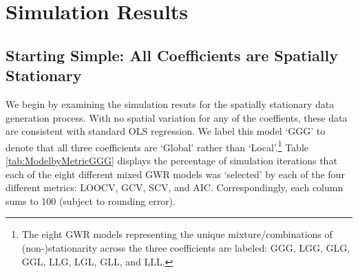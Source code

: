 \documentclass{article}\usepackage[]{graphicx}\usepackage[]{color}
\begin{document}
\section{Simulation Results}

\subsection{Starting Simple: All Coefficients are Spatially Stationary}

We begin by examining the simulation resuts for the spatially stationary data generation process. With no spatial variation for any of the coeffients, these data are consistent with standard OLS regression. We label this model `GGG' to denote that all three coefficients are `Global' rather than `Local'.\footnote{The eight GWR models representing the unique mixture/combinations of (non-)stationarity across the three coefficients are labeled: GGG, LGG, GLG, GGL, LLG, LGL, GLL, and LLL.} Table \ref{tab:ModelbyMetricGGG} displays the percentage of simulation iterations that each of the eight different mixed GWR models was `selected' by each of the four different metrics: LOOCV, GCV, SCV, and AIC. Correspondingly, each column sums to 100 (subject to rounding error). 
\end{document}
